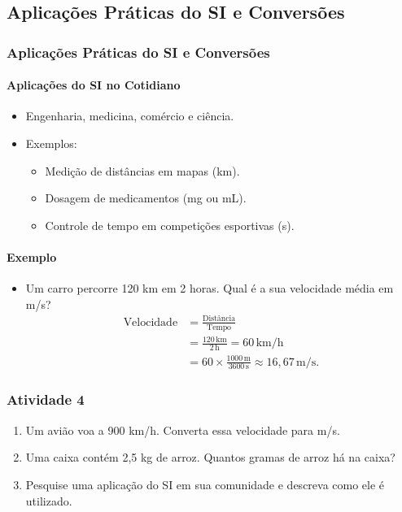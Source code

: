 \documentclass[12pt]{beamer}
\begin{document}
\begin{frame}
    \section{Aplicações Práticas do SI e Conversões}
    \frametitle{Aplicações Práticas do SI e Conversões}
    \framesubtitle{Aplicações do SI no Cotidiano}
    \begin{itemize}
        \item Engenharia, medicina, comércio e ciência.
        \item Exemplos:
            \begin{itemize}
                \item Medição de distâncias em mapas (km).
                \item Dosagem de medicamentos (mg ou mL).
                \item Controle de tempo em competições esportivas (s).
            \end{itemize}
    \end{itemize}

    \framesubtitle{Exemplo}
    \begin{itemize}
        \item Um carro percorre 120 km em 2 horas. Qual é a sua velocidade média em m/s?
            \begin{align*}
                \text{Velocidade} &= \frac{\text{Distância}}{\text{Tempo}} \\
                &= \frac{120 \, \text{km}}{2 \, \text{h}} = 60 \, \text{km/h} \\
                &= 60 \times \frac{1000 \, \text{m}}{3600 \, \text{s}} \approx 16,67 \, \text{m/s}.
            \end{align*}
    \end{itemize}
\end{frame}

\begin{frame}
    \frametitle{Atividade 4}
    \begin{enumerate}
        \item Um avião voa a 900 km/h. Converta essa velocidade para m/s.
        \item Uma caixa contém 2,5 kg de arroz. Quantos gramas de arroz há na caixa?
        \item Pesquise uma aplicação do SI em sua comunidade e descreva como ele é utilizado.
    \end{enumerate}
\end{frame}
\end{document}
